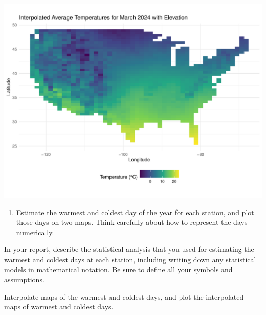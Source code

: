 \documentclass[
]{article}
\providecommand{\tightlist}{%
  \setlength{\itemsep}{0pt}\setlength{\parskip}{0pt}}
\begin{document}
\includegraphics{seesaw_files/figure-latex/unnamed-chunk-5-1.pdf}

\begin{enumerate}
\def\labelenumi{\arabic{enumi}.}
\setcounter{enumi}{2}
\tightlist
\item
  Estimate the warmest and coldest day of the year for each station, and
  plot those days on two maps. Think carefully about how to represent
  the days numerically.
\end{enumerate}

In your report, describe the statistical analysis that you used for
estimating the warmest and coldest days at each station, including
writing down any statistical models in mathematical notation. Be sure to
define all your symbols and assumptions.

Interpolate maps of the warmest and coldest days, and plot the
interpolated maps of warmest and coldest days.
\end{document}

